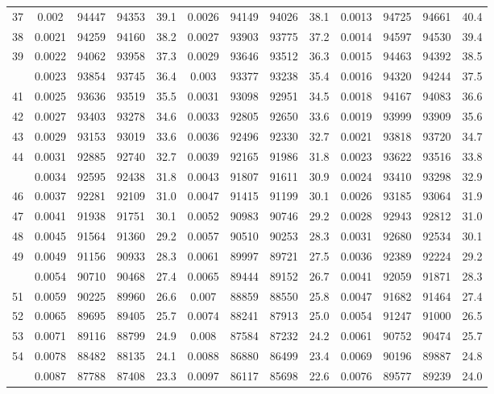 \documentclass[
  14pt,
]{article}
\begin{document}
\begin{longtable}[t]{lcccccccccccc}
37 & 0.002 & 94447 & 94353 & 39.1 & 0.0026 & 94149 & 94026 & 38.1 & 0.0013 & 94725 & 94661 & 40.4\\
38 & 0.0021 & 94259 & 94160 & 38.2 & 0.0027 & 93903 & 93775 & 37.2 & 0.0014 & 94597 & 94530 & 39.4\\
39 & 0.0022 & 94062 & 93958 & 37.3 & 0.0029 & 93646 & 93512 & 36.3 & 0.0015 & 94463 & 94392 & 38.5\\
\addlinespace
40 & 0.0023 & 93854 & 93745 & 36.4 & 0.003 & 93377 & 93238 & 35.4 & 0.0016 & 94320 & 94244 & 37.5\\
41 & 0.0025 & 93636 & 93519 & 35.5 & 0.0031 & 93098 & 92951 & 34.5 & 0.0018 & 94167 & 94083 & 36.6\\
42 & 0.0027 & 93403 & 93278 & 34.6 & 0.0033 & 92805 & 92650 & 33.6 & 0.0019 & 93999 & 93909 & 35.6\\
43 & 0.0029 & 93153 & 93019 & 33.6 & 0.0036 & 92496 & 92330 & 32.7 & 0.0021 & 93818 & 93720 & 34.7\\
44 & 0.0031 & 92885 & 92740 & 32.7 & 0.0039 & 92165 & 91986 & 31.8 & 0.0023 & 93622 & 93516 & 33.8\\
\addlinespace
45 & 0.0034 & 92595 & 92438 & 31.8 & 0.0043 & 91807 & 91611 & 30.9 & 0.0024 & 93410 & 93298 & 32.9\\
46 & 0.0037 & 92281 & 92109 & 31.0 & 0.0047 & 91415 & 91199 & 30.1 & 0.0026 & 93185 & 93064 & 31.9\\
47 & 0.0041 & 91938 & 91751 & 30.1 & 0.0052 & 90983 & 90746 & 29.2 & 0.0028 & 92943 & 92812 & 31.0\\
48 & 0.0045 & 91564 & 91360 & 29.2 & 0.0057 & 90510 & 90253 & 28.3 & 0.0031 & 92680 & 92534 & 30.1\\
49 & 0.0049 & 91156 & 90933 & 28.3 & 0.0061 & 89997 & 89721 & 27.5 & 0.0036 & 92389 & 92224 & 29.2\\
\addlinespace
50 & 0.0054 & 90710 & 90468 & 27.4 & 0.0065 & 89444 & 89152 & 26.7 & 0.0041 & 92059 & 91871 & 28.3\\
51 & 0.0059 & 90225 & 89960 & 26.6 & 0.007 & 88859 & 88550 & 25.8 & 0.0047 & 91682 & 91464 & 27.4\\
52 & 0.0065 & 89695 & 89405 & 25.7 & 0.0074 & 88241 & 87913 & 25.0 & 0.0054 & 91247 & 91000 & 26.5\\
53 & 0.0071 & 89116 & 88799 & 24.9 & 0.008 & 87584 & 87232 & 24.2 & 0.0061 & 90752 & 90474 & 25.7\\
54 & 0.0078 & 88482 & 88135 & 24.1 & 0.0088 & 86880 & 86499 & 23.4 & 0.0069 & 90196 & 89887 & 24.8\\
\addlinespace
55 & 0.0087 & 87788 & 87408 & 23.3 & 0.0097 & 86117 & 85698 & 22.6 & 0.0076 & 89577 & 89239 & 24.0\\

\end{longtable}
\end{document}
